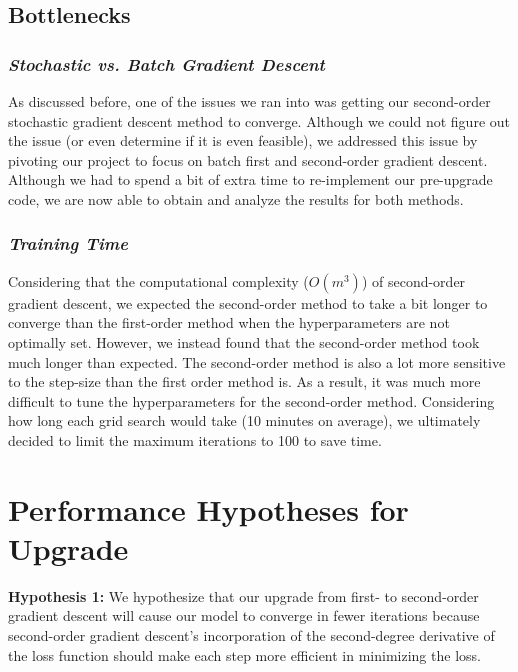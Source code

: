 \documentclass[11pt]{extarticle}
\begin{document}
\subsection{Bottlenecks}

\subsubsection{\textit{Stochastic vs. Batch Gradient Descent}}

As discussed before, one of the issues we ran into was getting our second-order stochastic gradient descent method to converge. Although we could not figure out the issue (or even determine if it is even feasible), we addressed this issue by pivoting our project to focus on batch first and second-order gradient descent. Although we had to spend a bit of extra time to re-implement our pre-upgrade code, we are now able to obtain and analyze the results for both methods.

\subsubsection{\textit{Training Time}}

Considering that the computational complexity ($O(m^3)$) of second-order gradient descent, we expected the second-order method to take a bit longer to converge than the first-order method when the hyperparameters are not optimally set. However, we instead found that the second-order method took much longer than expected. The second-order method is also a lot more sensitive to the step-size than the first order method is. As a result, it was much more difficult to tune the hyperparameters for the second-order method. Considering how long each grid search would take (10 minutes on average), we ultimately decided to limit the maximum iterations to 100 to save time.

\newpage

\section{Performance Hypotheses for Upgrade}

\textbf{Hypothesis 1:} We hypothesize that our upgrade from first- to second-order gradient descent will cause our model to converge in fewer iterations because second-order gradient descent's incorporation of the second-degree derivative of the loss function should make each step more efficient in minimizing the loss.
\end{document}
